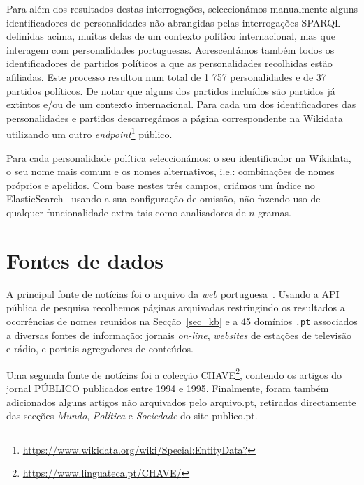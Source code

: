 \documentclass[a4paper, twocolumn, 11pt, twoside]{article}
\begin{document}
Para além dos resultados destas interrogações, seleccionámos manualmente alguns identificadores de personalidades não abrangidas pelas interrogações SPARQL definidas acima, muitas delas de um contexto político internacional, mas que interagem com personalidades portuguesas. Acrescentámos também todos os identificadores de partidos políticos a que as personalidades recolhidas estão afiliadas. Este processo resultou num total de 1 757 personalidades e de 37 partidos políticos. De notar que alguns dos partidos incluídos são partidos já extintos e/ou de um contexto internacional. Para cada um dos identificadores das personalidades e partidos descarregámos a página correspondente na Wikidata utilizando um outro \textit{endpoint}\footnote{\url{https://www.wikidata.org/wiki/Special:EntityData?}} público.


Para cada personalidade política seleccionámos: o seu identificador na Wikidata, o seu nome mais comum e os nomes alternativos, i.e.: combinações de nomes próprios e apelidos. Com base nestes três campos, criámos um índice no ElasticSearch~\citep{10.5555/2904394} usando a sua configuração de omissão, não fazendo uso de qualquer funcionalidade extra tais como analisadores de $n$-gramas.

\section{Fontes de dados}
\label{sec:data_sources}

A principal fonte de notícias foi o arquivo da \textit{web} portuguesa~\citep{SearchPastPWA2013}. Usando a API pública de pesquisa recolhemos páginas arquivadas restringindo os resultados a ocorrências de nomes reunidos na Secção~\ref{sec_kb} e a 45 domínios \texttt{.pt} associados a diversas fontes de informação: jornais \textit{on-line}, \textit{websites} de estações de televisão e rádio, e portais agregadores de conteúdos. 

Uma segunda fonte de notícias foi a colecção CHAVE\footnote{\url{https://www.linguateca.pt/CHAVE/}}\citep{DBLP:conf/clef/SantosR04, santos-rocha-2001-evaluating}, contendo os artigos do jornal PÚBLICO publicados entre 1994 e 1995. Finalmente, foram também adicionados alguns artigos não arquivados pelo arquivo.pt, retirados directamente das secções {\it Mundo}, {\it Política} e {\it Sociedade} do site publico.pt. 
\end{document}
